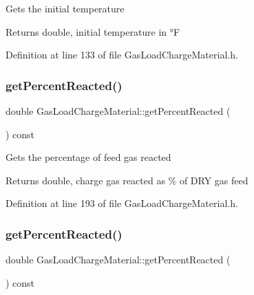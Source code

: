 Gets the initial temperature

\begin{DoxyReturn}{Returns}
double, initial temperature in °F 
\end{DoxyReturn}


Definition at line 133 of file Gas\+Load\+Charge\+Material.\+h.

\mbox{\label{class_gas_load_charge_material_af47b4c6c3e547325cadd81cbb09937ee}} 
\subsubsection{\texorpdfstring{get\+Percent\+Reacted()}{getPercentReacted()}\hspace{0.1cm}{\footnotesize\ttfamily [1/3]}}
{\footnotesize\ttfamily double Gas\+Load\+Charge\+Material\+::get\+Percent\+Reacted (\begin{DoxyParamCaption}{ }\end{DoxyParamCaption}) const\hspace{0.3cm}{\ttfamily [inline]}}

Gets the percentage of feed gas reacted

\begin{DoxyReturn}{Returns}
double, charge gas reacted as \% of D\+RY gas feed 
\end{DoxyReturn}


Definition at line 193 of file Gas\+Load\+Charge\+Material.\+h.

\mbox{\label{class_gas_load_charge_material_af47b4c6c3e547325cadd81cbb09937ee}} 
\subsubsection{\texorpdfstring{get\+Percent\+Reacted()}{getPercentReacted()}\hspace{0.1cm}{\footnotesize\ttfamily [2/3]}}
{\footnotesize\ttfamily double Gas\+Load\+Charge\+Material\+::get\+Percent\+Reacted (\begin{DoxyParamCaption}{ }\end{DoxyParamCaption}) const\hspace{0.3cm}{\ttfamily [inline]}}

